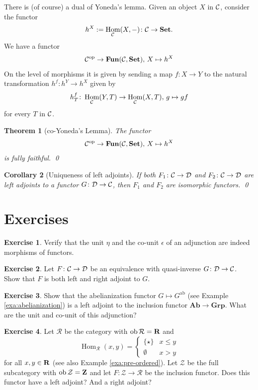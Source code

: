 \documentclass[11pt]{amsbook}
\DeclareMathOperator\Hom{Hom}
\DeclareMathOperator\ob{ob}
\def\cR{{\mathcal{R}}} \def\cZ{{\mathcal{Z}}}
\def\ab{\mathrm{ab}}
\def\opp{\mathrm{op}}
\def\Set{\mathbf{Set}}
\def\Ab{\mathbf{Ab}}
\def\Grp{\mathbf{Grp}}
\def\Fun{\mathbf{Fun}}
\theoremstyle{plain}
\newtheorem{theorem}{Theorem}
\newtheorem{corollary}[theorem]{Corollary}
\theoremstyle{definition}
\newtheorem{exercise}{Exercise}
\begin{document}
There is (of course) a dual of Yoneda's lemma. Given an object $X$ in ${\mathcal{C}}$, consider the functor
\[
	h^X := \Hom_\cC(X,-)\colon \cC \to \Set.
\]
We have a functor
\[
	\cC^\opp \to \Fun(\cC,\Set),\, X \mapsto h^X
\]
On the level of morphisms it is given by sending a map $f\colon X \to Y$ to the natural transformation $h^f\colon h^Y \to h^X$ given by
\[
	h^f_T\colon \Hom_\cC(Y,T) \to \Hom_\cC(X,T),\, g \mapsto gf
\]
for every $T$ in ${\mathcal{C}}$.

\begin{theorem}[co-Yoneda's Lemma]\label{thm:co-yoneda}
The functor
\[
	\cC^\opp \to \Fun(\cC,\Set),\, X \mapsto h^X
\]
is fully faithful. \qed
\end{theorem}

\begin{corollary}[Uniqueness of left adjoints]
If both $F_1\colon {\mathcal{C}} \to {\mathcal{D}}$ and $F_2\colon {\mathcal{C}} \to {\mathcal{D}}$ are left adjoints to a functor $G\colon {\mathcal{D}} \to {\mathcal{C}}$, then $F_1$ and $F_2$ are isomorphic functors. \qed
\end{corollary}


\newpage
\section*{Exercises}

\begin{exercise}
Verify that the unit $\eta$ and the co-unit $\epsilon$ of an adjunction are indeed morphisms of functors.
\end{exercise}

\begin{exercise}
Let $F\colon {\mathcal{C}} \to {\mathcal{D}}$ be an equivalence  with quasi-inverse $G\colon {\mathcal{D}} \to {\mathcal{C}}$. Show that $F$ is both left and right adjoint to $G$.
\end{exercise}

\begin{exercise}\label{exc:abelianization-adjunction}
Show that the abelianization functor $G\mapsto G^\ab$ (see Example \ref{exa:abelianization}) is a left adjoint to the inclusion functor $\Ab \to \Grp$. What are the unit and co-unit of this adjunction?
\end{exercise}

\begin{exercise}\label{exc:ordered-Z-and-R}
Let $\cR$ be the category with $\ob \cR  = \bR$ and 
\[
	\Hom_\cR(x,y) = \begin{cases}
	\{\star\} & x\leq y \\
	\emptyset & x > y
	\end{cases}
\]
for all $x,y\in {\mathbf{R}}$ (see also Example \ref{exa:pre-ordered}). Let $\cZ$ be the full subcategory with $\ob \cZ =\bZ$ and let $F\colon \cZ \to \cR$ be the inclusion functor. Does this functor have a left adjoint? And a right adjoint? 
\end{exercise}
\end{document}
